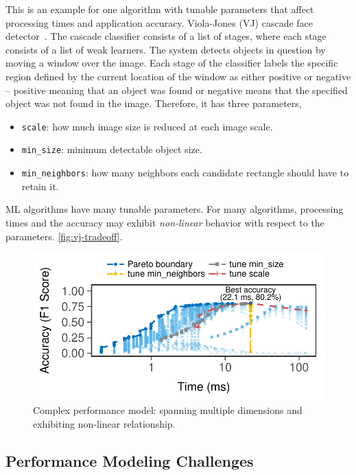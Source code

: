  This is an example for one algorithm with
tunable parameters that affect processing times and application
accuracy. Viola-Jones (VJ) cascade face detector~\cite{viola2001rapid}. The
cascade classifier consists of a list of stages, where each stage consists of a
list of weak learners.  The system detects objects in question by moving a
window over the image.  Each stage of the classifier labels the specific region
defined by the current location of the window as either positive or negative –
positive meaning that an object was found or negative means that the specified
object was not found in the image.  Therefore, it has three parameters,

\begin{itemize}[noitemsep, topsep=5pt]
\item \texttt{scale}: how much image size is reduced at each image scale.
\item \texttt{min\_size}: minimum detectable object size.
\item \texttt{min\_neighbors}: how many neighbors each candidate rectangle should
  have to retain it.
\end{itemize}

ML algorithms have many tunable parameters. For many algorithms, processing
times and the accuracy may exhibit \textit{non-linear} behavior with respect to
the parameters. \autoref{fig:vj-tradeoff}.

\begin{figure}[t]
  \centering
  \includegraphics[width=.8\columnwidth]{figures/exhaustive-face.pdf}
  \caption{Complex performance model: spanning multiple dimensions and
    exhibiting non-linear relationship.}
  \label{fig:vj-tradeoff}
\end{figure}

\subsection{Performance Modeling Challenges}
\label{sec:challenges}

